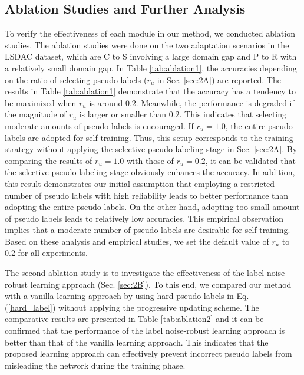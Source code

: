 \documentclass[a4paper,conference]{IEEEtran}
\begin{document}
\subsection{Ablation Studies and Further Analysis}
\label{sec:ablation}
To verify the effectiveness of each module in our method, we conducted ablation studies. The ablation studies were done on the two adaptation scenarios in the LSDAC dataset, which are C to S involving a large domain gap and P to R with a relatively small domain gap. In Table \ref{tab:ablation1}, the accuracies depending on the ratio of selecting pseudo labels ($r_{u}$ in Sec. \ref{sec:2A}) are reported. The results in Table \ref{tab:ablation1} demonstrate that the accuracy has a tendency to be maximized when $r_{u}$ is around 0.2. Meanwhile, the performance is degraded if the magnitude of $r_{u}$ is larger or smaller than $0.2$. This indicates that selecting moderate amounts of pseudo labels is encouraged. If $r_{u}=1.0$, the entire pseudo labels are adopted for self-training. Thus, this setup corresponds to the training strategy without applying the selective pseudo labeling stage in Sec. \ref{sec:2A}. By comparing the results of $r_{u}=1.0$ with those of $r_{u}=0.2$, it can be validated that the selective pseudo labeling stage obviously enhances the accuracy. In addition, this result demonstrates our initial assumption that employing a restricted number of pseudo labels with high reliability leads to better performance than adopting the entire pseudo labels. On the other hand, adopting too small amount of pseudo labels leads to relatively low accuracies. This empirical observation implies that a moderate number of pseudo labels are desirable for self-training. Based on these analysis and empirical studies, we set the default value of $r_{u}$ to 0.2 for all experiments.




The second ablation study is to investigate the effectiveness of the label noise-robust learning approach (Sec. \ref{sec:2B}). To this end, we compared our method with a vanilla learning approach by using hard pseudo labels in Eq. (\ref{hard_label}) without applying the progressive updating scheme. The comparative results are presented in Table \ref{tab:ablation2} and it can be confirmed that the performance of the label noise-robust learning approach is better than that of the vanilla learning approach. This indicates that the proposed learning approach can effectively prevent incorrect pseudo labels from misleading the network during the training phase.
\end{document}
